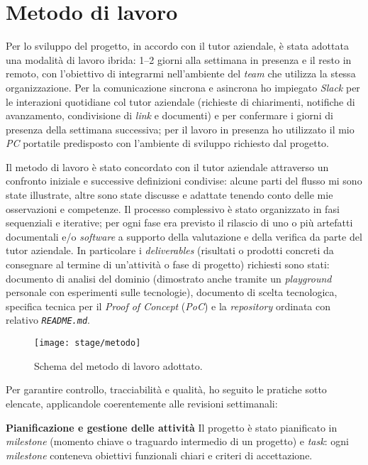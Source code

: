 \section{Metodo di lavoro}

Per lo sviluppo del progetto, in accordo con il tutor aziendale, è stata adottata una modalità di lavoro ibrida: 1–2 giorni alla settimana in presenza e il resto in remoto, 
con l'obiettivo di integrarmi nell'ambiente del \emph{team} che utilizza la stessa organizzazione. Per la comunicazione sincrona e asincrona ho impiegato 
\emph{Slack} per le interazioni quotidiane col tutor aziendale (richieste di chiarimenti, notifiche di avanzamento, condivisione di \emph{link} e documenti) e per confermare i giorni di presenza 
della settimana successiva; per il lavoro in presenza ho utilizzato il mio \emph{PC} portatile predisposto con l'ambiente di sviluppo richiesto dal progetto.

Il metodo di lavoro è stato concordato con il tutor aziendale attraverso un confronto iniziale e successive definizioni condivise: alcune parti del 
flusso mi sono state illustrate, altre sono state discusse e adattate tenendo conto delle mie osservazioni e competenze. 
Il processo complessivo è stato organizzato in fasi sequenziali e iterative; 
per ogni fase era previsto il rilascio di uno o più artefatti documentali e/o \emph{software} a supporto della valutazione e della verifica da parte del tutor aziendale. 
In particolare i \emph{deliverables} (risultati o prodotti concreti da consegnare al termine di un’attività o fase di progetto) richiesti sono stati: 
documento di analisi del dominio (dimostrato anche tramite un \emph{playground} personale con esperimenti sulle tecnologie), 
documento di scelta tecnologica, 
specifica tecnica per il \emph{Proof of Concept} (\emph{PoC}) 
e la \emph{repository} ordinata 
con relativo \texttt{\emph{README.md}}.

\begin{figure}[H]
    \centering
    \texttt{[image: stage/metodo]}
    \caption{Schema del metodo di lavoro adottato.}
    \label{fig:metodo}
\end{figure}

Per garantire controllo, tracciabilità e qualità, ho seguito le pratiche sotto elencate, applicandole coerentemente alle revisioni settimanali:

\medskip
\noindent\textbf{Pianificazione e gestione delle attività}
Il progetto è stato pianificato in \emph{milestone} (momento chiave o traguardo intermedio di un progetto) e \emph{task}: ogni \emph{milestone} conteneva obiettivi funzionali chiari e criteri di accettazione. 


